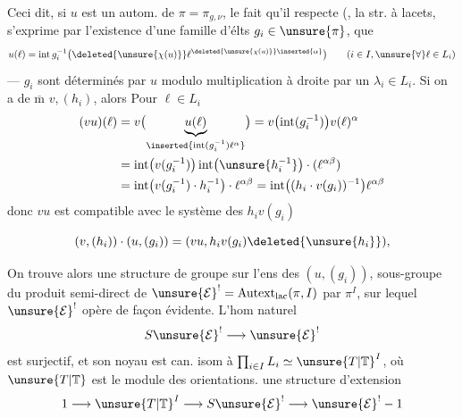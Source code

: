 Ceci dit, si $u$ est un autom. de $\pi=\pi_{g,\nu}$, le fait qu'il respecte (,  la str. à lacets, s'exprime par l'existence d'une famille d'élts $g_i\in\unsure{\pi}$,  que
\[
u(\ell)=\operatorname{int}g_i^{-1}\bigl(\deleted{\unsure{\chi(u)}}\ell^{\deleted{\unsure{\chi(u)}}\inserted{\alpha}}\bigr)
\qquad(i\in I,\unsure{\forall}\ell\in L_i)
\]
---  $g_i$ sont déterminés par $u$  modulo multiplication à droite par un $\lambda_i\in L_i$. Si on a de $\overline{\mathrm m}$ $v,(h_i)$, alors  Pour $\ell\in L_i$ 
\[
\begin{aligned}
(vu)(\ell)
&=v\bigl(\underbrace{u(\ell)}_{\inserted{\operatorname{int}(g_i^{-1})\ell^{\alpha}}}\bigr)
=v\bigl(\operatorname{int}(g_i^{-1})\bigr)v(\ell)^{\alpha}\\
&=\operatorname{int}\bigl(v(g_i^{-1})\bigr)\operatorname{int}\bigl(\unsure{h_i^{-1}}\bigr)\cdot(\ell^{\alpha\beta})\\
&=\operatorname{int}\bigl(v(g_i^{-1})\cdot h_i^{-1}\bigr)\cdot\ell^{\alpha\beta}
=\operatorname{int}\bigl((h_i\cdot v(g_i))^{-1}\bigr)\ell^{\alpha\beta}
\end{aligned}
\]
donc $vu$ est compatible avec le système des  $h_i v(g_i)$ 


\[
(v,(h_i))\cdot(u,(g_i))=(vu,h_i v(g_i)\deleted{\unsure{h_i}}),
\]

On trouve alors une structure de groupe sur l'ens  des $(u,(g_i))$, sous-groupe du produit semi-direct de $\unsure{\mathcal E}^{!}=\mathrm{Autext}_{\mathrm{lac}}(\pi,I)$  par $\pi^I$, sur lequel $\unsure{\mathcal E}^{!}$ opère de façon évidente. L'hom naturel
\[
S\unsure{\mathcal E}^{!}\longrightarrow\unsure{\mathcal E}^{!}
\]
est surjectif, et son noyau est can. isom à $\prod_{i\in I} L_i\simeq \unsure{T|\mathbb T}^I$, où $\unsure{T|\mathbb T}$ est le module des orientations.
 une structure d'extension 
\[
1\longrightarrow \unsure{T|\mathbb T}^I\longrightarrow S\unsure{\mathcal E}^{!}\longrightarrow\unsure{\mathcal E}^{!}-1
\]

